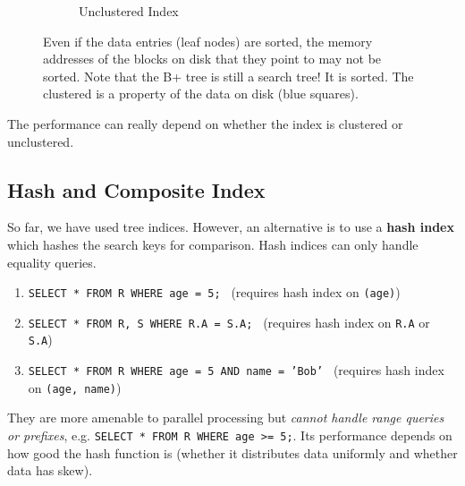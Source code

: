 \begin{definition}
\begin{figure}[H]
\begin{subfigure}[b]{0.48\textwidth}
          \caption{Unclustered Index}
        \end{subfigure}
        \caption{Even if the data entries (leaf nodes) are sorted, the memory addresses of the blocks on disk that they point to may not be sorted. Note that the B+ tree is still a search tree! It is sorted. The clustered is a property of the data on disk (blue squares).} 
        \label{fig:clustered_vs_unclustered}
      \end{figure}
    \end{definition}

    The performance can really depend on whether the index is clustered or unclustered. 

\subsection{Hash and Composite Index}

  \begin{definition}
    So far, we have used tree indices. However, an alternative is to use a \textbf{hash index} which hashes the search keys for comparison. Hash indices can only handle equality queries. 
    \begin{enumerate}
      \item \texttt{SELECT * FROM R WHERE age = 5; } (requires hash index on \texttt{(age)})
      \item \texttt{SELECT * FROM R, S WHERE R.A = S.A; } (requires hash index on \texttt{R.A} or \texttt{S.A})
      \item \texttt{SELECT * FROM R WHERE age = 5 AND name = 'Bob' } (requires hash index on \texttt{(age, name)})
    \end{enumerate}
    They are more amenable to parallel processing but \textit{cannot handle range queries or prefixes}, e.g. \texttt{SELECT * FROM R WHERE age >= 5;}. Its performance depends on how good the hash function is (whether it distributes data uniformly and whether data has skew). 
  \end{definition}

